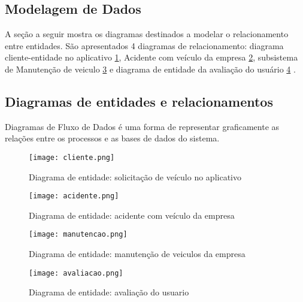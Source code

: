





\subsection{Modelagem de Dados}
A seção a seguir mostra os diagramas destinados a modelar o relacionamento entre entidades. São apresentados 4 diagramas de relacionamento: diagrama cliente-entidade no aplicativo \ref{aplicativo}, Acidente com veículo da empresa \ref{acidente},  subsistema de Manutenção de veiculo \ref{manutencao} e diagrama de entidade da avaliação do usuário \ref{avaliacao} .
\subsection{Diagramas de entidades e relacionamentos}
Diagramas de Fluxo de Dados é uma forma de representar graficamente as relações entre os processos e as bases de dados do sistema.

\begin{figure}[H]
      \begin{center}
            \caption{Diagrama de entidade: solicitação de veículo no aplicativo} \label{aplicativo}
            \texttt{[image: cliente.png]} \\

      \end{center}
\end{figure}


\begin{figure}[H]
      \begin{center}
            \caption{Diagrama de entidade: acidente com veículo da empresa} \label{acidente}
            \texttt{[image: acidente.png]} \\

      \end{center}
\end{figure}

\begin{figure}[H]
      \begin{center}
            \caption{Diagrama de entidade: manutenção de veiculos da empresa} \label{manutencao}
            \texttt{[image: manutencao.png]} \\

      \end{center}
\end{figure}

\begin{figure}[H]
      \begin{center}
            \caption{Diagrama de entidade: avaliação do usuario} \label{avaliacao}
            \texttt{[image: avaliacao.png]} \\
      \end{center}
\end{figure}
